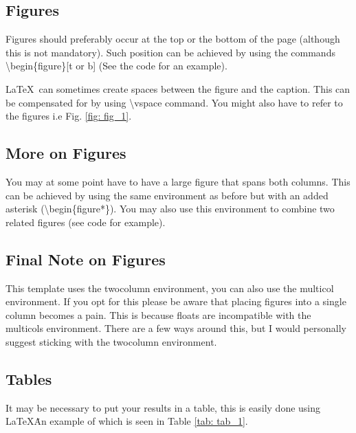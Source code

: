 \documentclass[a4paper,12pt, notitlepage]{article}
\begin{document}
\subsection{Figures}
Figures should preferably occur at the top or the bottom of the page (although this is not mandatory). Such position can be achieved by using the commands \textbackslash begin\{figure\}[t or b] (See the code for an example).  


\LaTeX\ can sometimes create spaces between the figure and the caption. This can be compensated for by using \textbackslash vspace command. You might also have to refer to the figures i.e Fig. \ref{fig: fig_1}.

\vspace{-5mm}

\subsection{More on Figures}
You may at some point have to have a large figure that spans both columns. This can be achieved by using the same environment as before but with an added asterisk (\textbackslash begin\{figure*\}). You may also use this environment to combine two related figures (see code for example).

\subsection{Final Note on Figures}
This template uses the twocolumn environment, you can also use the multicol environment. If you opt for this please be aware that placing figures into a single column becomes a pain. This is because floats are incompatible with the multicols environment. There are a few ways around this, but I would personally suggest sticking with the twocolumn environment.

\subsection{Tables}
\label{table}
It may be necessary to put your results in a table, this is easily done using \LaTeX\. An example of which is seen in Table \ref{tab: tab_1}.
\end{document}
